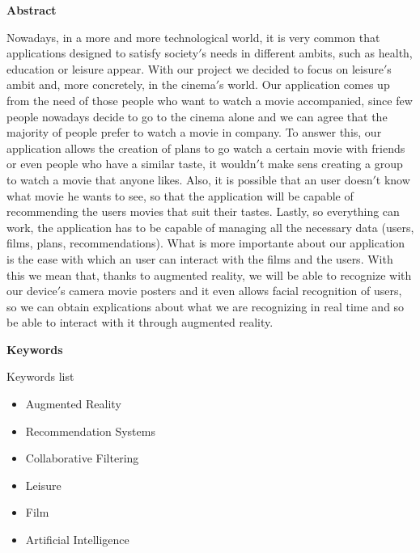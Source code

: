 
\newpage

\thispagestyle{empty}

\begin{center}

{\bf \Huge Abstract}

  \end{center}
\vspace{1cm}

Nowadays, in a more and more technological world, it is very common that applications designed to satisfy society$'$s needs in different ambits, such as health, education or leisure appear.
With our project we decided to focus on leisure$'$s ambit and, more concretely, in the cinema$'$s world.
Our application comes up from the need of those people who want to watch a movie accompanied, since few people nowadays decide to go to the cinema alone and we can agree that the majority of people prefer to watch a movie in company.
To answer this, our application allows the creation of plans to go watch a certain movie with friends or even people who have a similar taste, it wouldn$'$t make sens creating a group to watch a movie
that anyone likes. Also, it is possible that an user doesn$'$t know what movie he wants to see, so that the application will be capable of recommending the users movies that
suit their tastes. Lastly, so everything can work, the application has to be capable of managing all the necessary data (users, films, plans, recommendations).
What is more importante about our application is the ease with which an user can interact with the films and the users. With this we mean that, thanks to augmented reality, we will be able to recognize with our device$'$s camera movie posters and it even
allows facial recognition of users, so we can obtain explications about what we are recognizing in real time and so be able to interact with it through augmented reality.

\vspace{1cm}

\begin{center}

  {\bf \Large Keywords}
  
     \end{center}
  
     \vspace{0.5cm}
     
     Keywords list
     \begin{itemize}  
      \item Augmented Reality
      \item Recommendation Systems
      \item Collaborative Filtering
      \item Leisure
      \item Film
      \item Artificial Intelligence
    \end{itemize}
   


